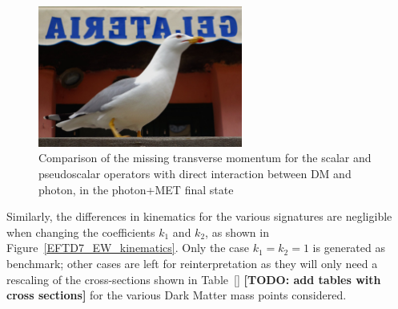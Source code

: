 \begin{figure}
    \includegraphics[width=0.6\textwidth]{figures/llug}
    \caption{Comparison of the missing transverse momentum for the scalar and pseudoscalar
    operators with direct interaction between DM and photon, in the photon+MET final state}
    \label{fig:EW_EFT5_gamma_MET}
\end{figure}

Similarly, the differences in kinematics for the various signatures 
are negligible when changing the coefficients $k_1$ and $k_2$, as shown
in Figure~\ref{EFTD7_EW_kinematics}. Only the case $k_1=k_2=1$ is generated as benchmark; 
other cases are left for reinterpretation as they will only need a rescaling of the cross-sections
shown in Table~\ref{} \textbf{[TODO: add tables with cross sections]} for the various Dark Matter
mass points considered. 

